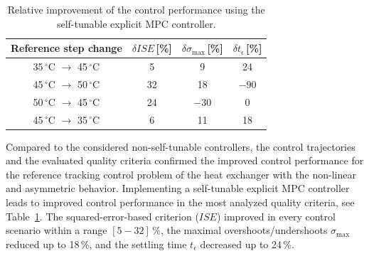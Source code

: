 \documentclass[preprint,12pt]{elsarticle}
\begin{document}
	\begin{table}[h!]
		\begin{center}
			\caption{Relative improvement of the control performance using the self-tunable explicit MPC controller.}
			\label{tab:improvement}
			\begin{tabular}{c|c|c|c} 
				Reference step change & $\delta ISE$\,[\%] & $\delta \sigma_{\mathrm{max}}$\,[\%] & $\delta t_{\epsilon}$\,[\%]  \\
				\hline
				35\,$^{\circ}$C $\rightarrow$ 45\,$^{\circ}$C &  5 &  9 & 24 \\ 
				45\,$^{\circ}$C $\rightarrow$ 50\,$^{\circ}$C & 32 & 18 &$-90$  \\ 
				50\,$^{\circ}$C $\rightarrow$ 45\,$^{\circ}$C & 24 &$-30$& 0 \\ 
				45\,$^{\circ}$C $\rightarrow$ 35\,$^{\circ}$C &  6 & 11 & 18   
			\end{tabular}
		\end{center}
	\end{table}
	
	
	Compared to the considered non-self-tunable controllers, the control trajectories and the evaluated quality criteria confirmed the improved control performance for the reference tracking control problem of the heat exchanger with the non-linear and asymmetric behavior. Implementing a self-tunable explicit MPC controller leads to improved control performance in the most analyzed quality criteria, see Table~\ref{tab:improvement}.	 
	The squared-error-based criterion ($ISE$) improved in every control scenario within a range $[5-32]$\,\%, the maximal overshoots/undershoots $\sigma_{\mathrm{max}}$ reduced up to 18\,\%, and the settling time $t_{\epsilon}$ decreased up to 24\,\%.  
	
\end{document}
